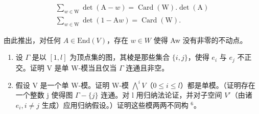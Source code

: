 \[
\begin{array}{c} \sum_ {w \in \mathrm{W}} \det (\mathrm{A} - w) = \operatorname{Card} (\mathrm{W}). \det (\mathrm{A}) \\ \sum_ {w \in \mathrm{W}} \det (1 - \mathrm{A} w) = \operatorname{Card} (\mathrm{W}). \end{array}
\]

由此推出，对任何 \(A \in \text{End}(V)\)，存在 \(w \in W\) 使得 Aw 没有非零的不动点。

\begin{enumerate}
\def\labelenumi{\alph{enumi})}
\setcounter{enumi}{2}
\item
  设 \(\Gamma\) 是以 \([1,l]\) 为顶点集的图，其棱是那些集合 \(\{i,j\}\)，使得 \(e_{i}\) 与 \(e_{j}\) 不正交。证明 V 是单 W-模当且仅当 \(\Gamma\) 连通且非空。
\item
  假设 V 是一个单 W-模。证明 W-模 \(\bigwedge^{i}V\)（\(0 \leqslant i \leqslant l\)）都是单模。（证明存在一个整数 j 使得图 \(\Gamma - \{j\}\) 连通。对 l 用归纳法论证，并对子空间 \(V'\)（由诸 \(e_{i}, i \neq j\) 生成）应用归纳假设。）证明这些模两两不同构 \(^{6}\)。
\end{enumerate}

